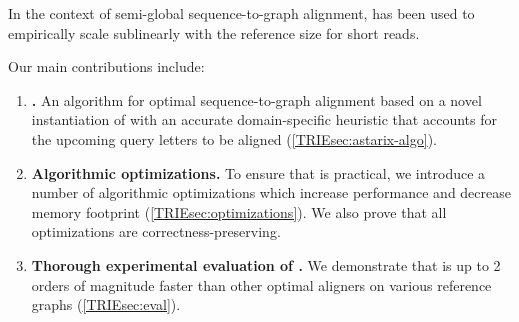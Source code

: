 In the context of semi-global sequence-to-graph alignment, \A has been used to
empirically scale sublinearly with the reference size for short reads.

\begin{samepage}
Our main contributions include:
	
\begin{enumerate}
	\item \textbf{\astarix.} An algorithm for optimal sequence-to-graph
	alignment based on a novel instantiation of \A with an accurate
	domain-specific heuristic that accounts for the upcoming query letters to be
	aligned (\cref{TRIEsec:astarix-algo}).
	\item \textbf{Algorithmic optimizations.}
	To ensure that \astarix is practical, we introduce a number of algorithmic
	optimizations which increase performance and decrease memory footprint
	(\cref{TRIEsec:optimizations}). We also prove that all optimizations are
	correctness-preserving.
	\item \textbf{Thorough experimental evaluation of \astarix.}
	We demonstrate that \astarix is up to 2 orders of magnitude faster than
	other optimal aligners on various reference graphs (\cref{TRIEsec:eval}).
\end{enumerate}
\end{samepage}
